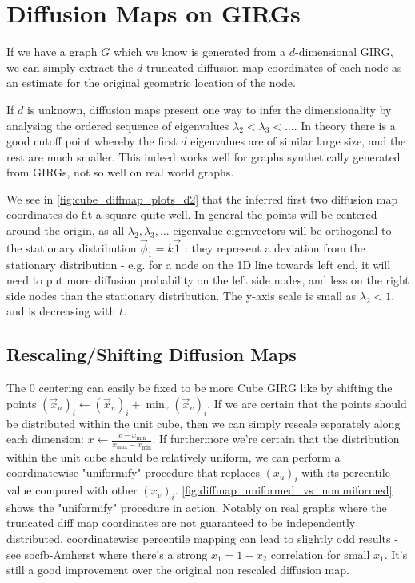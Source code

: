 \section{Diffusion Maps on GIRGs}
If we have a graph $G$ which we know is generated from a $d$-dimensional GIRG, we can simply extract the $d$-truncated diffusion map coordinates of each node as an estimate for the original geometric location of the node.

If $d$ is unknown, diffusion maps present one way to infer the dimensionality by analysing the ordered sequence of eigenvalues $\lambda_2 < \lambda_3 < ...$. In theory there is a good cutoff point whereby the first $d$ eigenvalues are of similar large size, and the rest are much smaller. This indeed works well for graphs synthetically generated from GIRGs, not so well on real world graphs.


We see in \cref{fig:cube_diffmap_plots_d2} that the inferred first two diffusion map coordinates do fit a square quite well. In general the points will be centered around the origin, as all $\lambda_2, \lambda_3, ...$ eigenvalue eigenvectors will be orthogonal to the stationary distribution $\vec{\phi}_1 = k \vec{1}$ : they represent a deviation from the stationary distribution - e.g. for a node on the 1D line towards left end, it will need to put more diffusion probability on the left side nodes, and less on the right side nodes than the stationary distribution. The y-axis scale is small as $\lambda_2 < 1$, and is decreasing with $t$.

\subsection{Rescaling/Shifting Diffusion Maps}
The 0 centering can easily be fixed to be more Cube GIRG like by shifting the points $(\vec{x}_u)_i \gets (\vec{x}_u)_i + \min_v (\vec{x}_v)_i$.
If we are certain that the points should be distributed within the unit cube, then we can simply rescale separately along each dimension: $x \gets \frac{x - x_{\min}}{x_{\max} - x_{\min}}$.
If furthermore we're certain that the distribution within the unit cube should be relatively uniform, we can perform a coordinatewise "uniformify" procedure that replaces $(x_u)_i$ with its percentile value compared with other $(x_v)_i$. \cref{fig:diffmap_uniformed_vs_nonuniformed} shows the "uniformify" procedure in action. Notably on real graphs where the truncated diff map coordinates are not guaranteed to be independently distributed, coordinatewise percentile mapping can lead to slightly odd results - see socfb-Amherst where there's a strong $x_1 = 1 - x_2$ correlation for small $x_1$. It's still a good improvement over the original non rescaled diffusion map.

